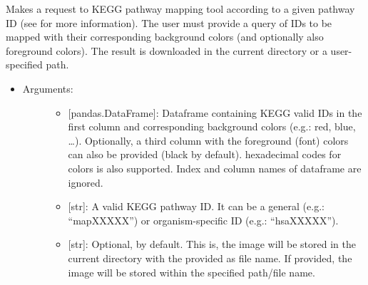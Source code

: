 \documentclass[letterpaper,10pt,english]{sphinxmanual}
\begin{document}
\begin{fulllineitems}
\label{\detokenize{databases:data_tools.databases.kegg_pathway_mapping}}
Makes a request to KEGG pathway mapping tool according to a given
pathway ID (see  for
more information). The user must provide a query of IDs to be mapped
with their corresponding background colors (and optionally also
foreground colors). The result is downloaded in the current
directory or a user-specified path.
\begin{itemize}
\item {} \begin{description}
\item[{Arguments:}] \leavevmode\begin{itemize}
\item {} 
 {[}pandas.DataFrame{]}: Dataframe containing KEGG valid IDs
in the first column and corresponding background colors (e.g.:
red, blue, …). Optionally, a third column with the
foreground (font) colors can also be provided (black by
default).  hexadecimal codes for colors is also
supported. Index and column names of dataframe are ignored.

\item {} 
 {[}str{]}: A valid KEGG pathway ID. It can be a general
(e.g.: “mapXXXXX”) or organism-specific ID (e.g.: “hsaXXXXX”).

\item {} 
 {[}str{]}: Optional,  by default. This is, the
image will be stored in the current directory with the 
provided as file name. If provided, the image will be stored
within the specified path/file name.

\end{itemize}

\end{description}


\end{itemize}
\end{fulllineitems}
\end{document}
